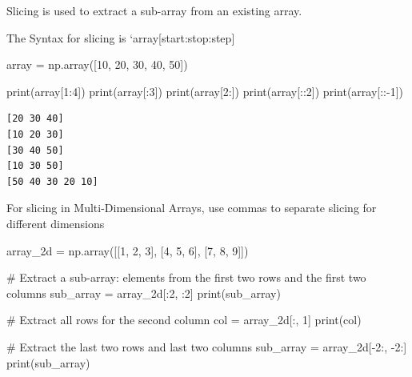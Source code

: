 \documentclass[
  letterpaper,
  DIV=11,
  numbers=noendperiod]{scrreprt}
\newenvironment{Shaded}{\begin{snugshade}}{\end{snugshade}}
\newcommand{\BuiltInTok}[1]{\textcolor[rgb]{0.00,0.23,0.31}{#1}}
\newcommand{\CommentTok}[1]{\textcolor[rgb]{0.37,0.37,0.37}{#1}}
\newcommand{\DecValTok}[1]{\textcolor[rgb]{0.68,0.00,0.00}{#1}}
\newcommand{\NormalTok}[1]{\textcolor[rgb]{0.00,0.23,0.31}{#1}}
\newcommand{\OperatorTok}[1]{\textcolor[rgb]{0.37,0.37,0.37}{#1}}
\begin{document}
Slicing is used to extract a sub-array from an existing array.

The Syntax for slicing is `array{[}start:stop:step{]}

\begin{Shaded}
\begin{Highlighting}[]
\NormalTok{array }\OperatorTok{=}\NormalTok{ np.array([}\DecValTok{10}\NormalTok{, }\DecValTok{20}\NormalTok{, }\DecValTok{30}\NormalTok{, }\DecValTok{40}\NormalTok{, }\DecValTok{50}\NormalTok{])}

\BuiltInTok{print}\NormalTok{(array[}\DecValTok{1}\NormalTok{:}\DecValTok{4}\NormalTok{])  }
\BuiltInTok{print}\NormalTok{(array[:}\DecValTok{3}\NormalTok{])  }
\BuiltInTok{print}\NormalTok{(array[}\DecValTok{2}\NormalTok{:])  }
\BuiltInTok{print}\NormalTok{(array[::}\DecValTok{2}\NormalTok{])  }
\BuiltInTok{print}\NormalTok{(array[::}\OperatorTok{{-}}\DecValTok{1}\NormalTok{]) }
\end{Highlighting}
\end{Shaded}

\begin{verbatim}
[20 30 40]
[10 20 30]
[30 40 50]
[10 30 50]
[50 40 30 20 10]
\end{verbatim}

For slicing in Multi-Dimensional Arrays, use commas to separate slicing
for different dimensions

\begin{Shaded}
\begin{Highlighting}[]
\NormalTok{array\_2d }\OperatorTok{=}\NormalTok{ np.array([[}\DecValTok{1}\NormalTok{, }\DecValTok{2}\NormalTok{, }\DecValTok{3}\NormalTok{], [}\DecValTok{4}\NormalTok{, }\DecValTok{5}\NormalTok{, }\DecValTok{6}\NormalTok{], [}\DecValTok{7}\NormalTok{, }\DecValTok{8}\NormalTok{, }\DecValTok{9}\NormalTok{]])}

\CommentTok{\# Extract a sub{-}array: elements from the first two rows and the first two columns}
\NormalTok{sub\_array }\OperatorTok{=}\NormalTok{ array\_2d[:}\DecValTok{2}\NormalTok{, :}\DecValTok{2}\NormalTok{]}
\BuiltInTok{print}\NormalTok{(sub\_array)  }

\CommentTok{\# Extract all rows for the second column}
\NormalTok{col }\OperatorTok{=}\NormalTok{ array\_2d[:, }\DecValTok{1}\NormalTok{]}
\BuiltInTok{print}\NormalTok{(col) }

\CommentTok{\# Extract the last two rows and last two columns}
\NormalTok{sub\_array }\OperatorTok{=}\NormalTok{ array\_2d[}\OperatorTok{{-}}\DecValTok{2}\NormalTok{:, }\OperatorTok{{-}}\DecValTok{2}\NormalTok{:]}
\BuiltInTok{print}\NormalTok{(sub\_array)  }
\end{Highlighting}
\end{Shaded}
\end{document}
